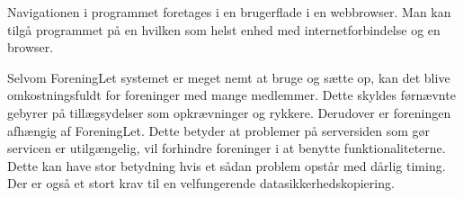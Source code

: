 Navigationen i programmet foretages i en brugerflade i en webbrowser. Man kan tilgå programmet på en hvilken som helst enhed med internetforbindelse og en browser.


Selvom ForeningLet systemet er meget nemt at bruge og sætte op, kan det blive omkostningsfuldt for foreninger med mange medlemmer. Dette skyldes førnævnte gebyrer på tillægsydelser som opkrævninger og rykkere. Derudover er foreningen afhængig af ForeningLet. Dette betyder at problemer på serversiden som gør servicen er utilgængelig, vil forhindre foreninger i at benytte funktionaliteterne. Dette kan have stor betydning hvis et sådan problem opstår med dårlig timing. Der er også et stort krav til en velfungerende datasikkerhedskopiering.


